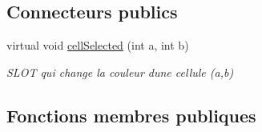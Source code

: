 \subsection*{Connecteurs publics}
\begin{DoxyCompactItemize}
\item 
virtual void \hyperlink{class_autocell1_d_ac38fb0d27778ecdff40628556956f64a}{cell\+Selected} (int a, int b)
\begin{DoxyCompactList}\small\item\em S\+L\+OT qui change la couleur d\textquotesingle{}une cellule (a,b) \end{DoxyCompactList}\end{DoxyCompactItemize}
\subsection*{Fonctions membres publiques}
